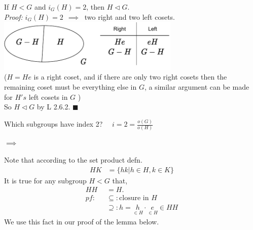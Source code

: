 \setcounter{dummy_lemma}{1}
\begin{corollary} 

If $H<G$ and $i_G(H)=2$, then $H\triangleleft G$. \\
\textit{Proof:}  $i_G(H)=2 \ \ \implies \ $ two right and two left cosets.\\
\includegraphics[width=0.65\textwidth]{Figures/as(1).pdf} \\($H=He$ is a right coset, and if there are only two right cosets then the remaining coset must be everything else in $G$, a similar argument can be made for $H's$ left cosets in $G$ )\\
So $H\triangleleft G$ by L 2.6.2. $\blacksquare$
\end{corollary}
Which subgroups have index 2? \ \ $i=2=\frac{o(G)}{o(H)}$ \steezybreak\\
\begin{center}
  $\implies$\ \ \ \   
\end{center}\steezybreak
Note that according to the set product defn.
\begin{align}
    HK&=\{hk|h\in H, k\in K\} \nonumber 
    \end{align}
It is true for any subgroup $H<G$ that, 
\begin{align}
    HH&=H. \nonumber \\
    \textit{pf:} \ \ \ \ &\subseteq : \text{closure in } H \nonumber \\
    &\supseteq : h=\underset{\in H}{h}\cdot\underset{\in H}{ e} \in  HH \nonumber 
\end{align}
We use this fact in our proof of the lemma below.

